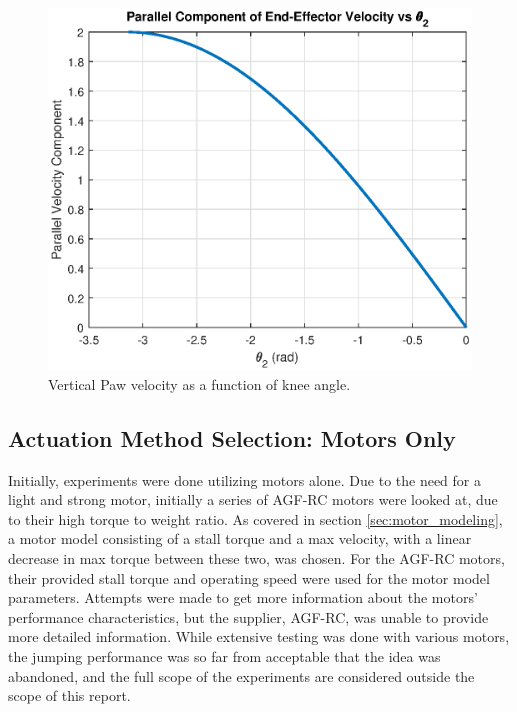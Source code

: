 \begin{figure}[h]
    \centering
    \includegraphics[width=\textwidth]{Images/vertical_paw_velocity.eps}
    \caption{Vertical Paw velocity as a function of knee angle.}
    \label{fig:vertical_jacobian_velocity}
\end{figure}

\subsection{Actuation Method Selection: Motors Only}
\label{sec:design_motor_only_jumps}

Initially, experiments were done utilizing motors alone. Due to the need for a light and strong motor, initially a series of AGF-RC motors were looked at, due to their high torque to weight ratio. As covered in section \ref{sec:motor_modeling}, a motor model consisting of a stall torque and a max velocity, with a linear decrease in max torque between these two, was chosen. For the AGF-RC motors, their provided stall torque and operating speed were used for the motor model parameters. Attempts were made to get more information about the motors' performance characteristics, but the supplier, AGF-RC, was unable to provide more detailed information. While extensive testing was done with various motors, the jumping performance was so far from acceptable that the idea was abandoned, and the full scope of the experiments are considered outside the scope of this report.


